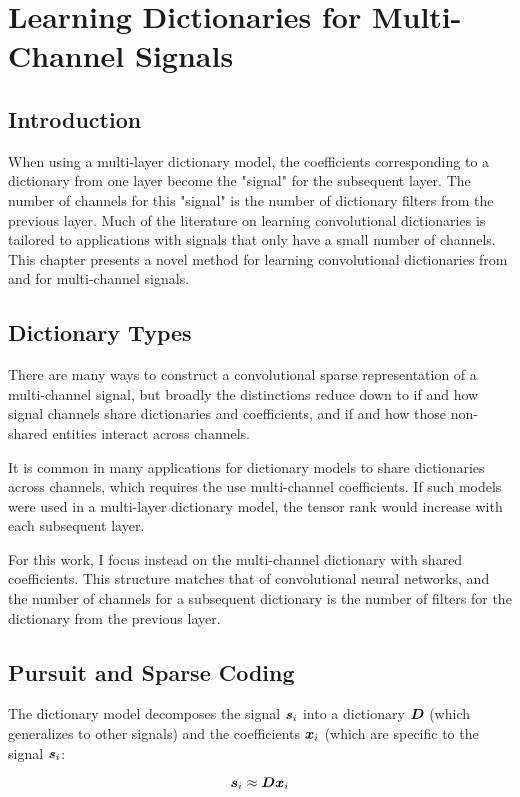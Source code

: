\chapter{Learning Dictionaries for Multi-Channel Signals}

\section{Introduction}
When using a multi-layer dictionary model, the coefficients corresponding to a dictionary from one layer become the "signal" for the subsequent layer.  The number of channels for this "signal" is the number of dictionary filters from the previous layer.  Much of the literature on learning convolutional dictionaries is tailored to applications with signals that only have a small number of channels.  This chapter presents a novel method for learning convolutional dictionaries from and for multi-channel signals. 
\section{Dictionary Types}
There are many ways to construct a convolutional sparse representation of a multi-channel signal, but broadly the distinctions reduce down to if and how signal channels share dictionaries and coefficients, and if and how those non-shared entities interact across channels.

It is common in many applications for dictionary models to share dictionaries across channels, which requires the use multi-channel coefficients. If such models were used in a multi-layer dictionary model, the tensor rank would increase with each subsequent layer.

For this work, I focus instead on the multi-channel dictionary with shared coefficients. This structure matches that of convolutional neural networks, and the number of channels for a subsequent dictionary is the number of filters for the dictionary from the previous layer.
\section{Pursuit and Sparse Coding}
\label{section:sparse coding}
The dictionary model decomposes the signal $\bm{s}_i$ into a dictionary $\bm{D}$ (which generalizes to other signals) and the coefficients $\bm{x}_i$ (which are specific to the signal $\bm{s}_i$:

\begin{equation}
\bm{s}_i \approx \bm{D}\bm{x}_i
\end{equation}

